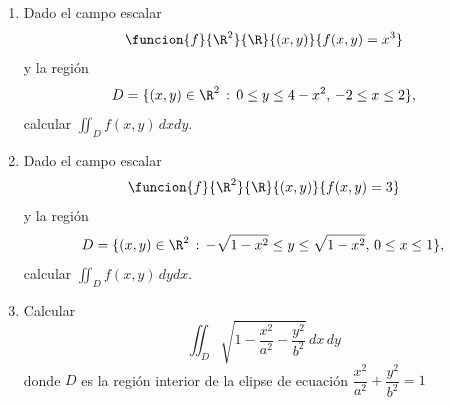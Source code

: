 \documentclass[a4,11pt]{aleph-examen}
\begin{document}
\begin{preguntas}
\begin{respuesta}
\begin{respuesta}
\begin{respuesta}
\begin{enumerate}
\item 
    Dado el campo escalar
    \[
        \funcion{f}{\R^2}{\R}
        {(x,y)}{f(x,y)=x^3}
	\]
    y la región
	\[
        D=\{(x,y)\in\R^2 \, : \, 0 \leq y \leq 4 - x^2, \, -2 \leq x \leq 2 \},
    \]
    calcular $\iint_D f(x,y)\, dxdy.$

\begin{respuesta}
\end{respuesta}
    
\item 
    Dado el campo escalar
    \[
        \funcion{f}{\R^2}{\R}
        {(x,y)}{f(x,y)=3}
	\]
    y la región
	\[
        D=\{(x,y)\in\R^2 \, : \, - \sqrt{1-x^2} \leq y \leq \sqrt{1-x^2}, \, 0 \leq x \leq 1 \},
    \]
    calcular $\iint_D f(x,y)\, dydx.$

\begin{respuesta}
\end{respuesta}

\item
    Calcular
    \[
        \iint_D \sqrt{1-\frac{x^2}{a^2}-\frac{y^2}{b^2}}\,dx\,dy
    \]
    donde $D$ es la región interior de la elipse de ecuación $\dfrac{x^2}{a^2}+\dfrac{y^2}{b^2}=1$ 
    

\end{enumerate}
\end{respuesta}
\end{respuesta}
\end{respuesta}
\end{preguntas}
\end{document}
